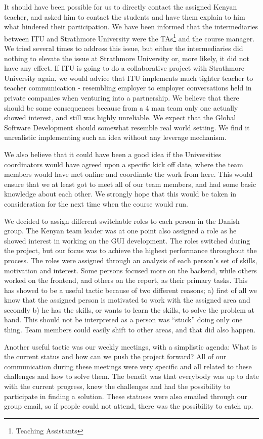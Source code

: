 It should have been possible for us to directly contact the assigned Kenyan teacher, and asked him to contact the students and have them explain to him what hindered their participation. We have been informed that the intermediaries between ITU and Strathmore University were the TAs\footnote{Teaching Assistants} and the course manager. We tried several times to address this issue, but either the intermediaries did nothing to elevate the issue at Strathmore University or, more likely, it did not have any effect. If ITU is going to do a collaborative project with Strathmore University again, we would advice that ITU implements much tighter teacher to teacher communication - resembling employer to employer conversations held in private companies when venturing into a partnership. We believe that there should be some consequences because from a 4 man team only one actually showed interest, and still was highly unreliable. We expect that the Global Software Development should somewhat resemble real world setting. We find it unrealistic implementing such an idea without any leverage mechanism.

We also believe that it could have been a good idea if the Universities coordinators would have agreed upon a specific kick off date, where the team members would have met online and coordinate the work from here. This would ensure that we at least got to meet all of our team members, and had some basic knowledge about each other. We strongly hope that this would be taken in consideration for the next time when the course would run.

We decided to assign different switchable roles to each person in the Danish group. The Kenyan team leader was at one point also assigned a role as he showed interest in working on the GUI development. The roles switched during the project, but our focus was to achieve the highest performance throughout the process. The roles were assigned through an analysis of each person's set of skills, motivation and interest. Some persons focused more on the backend, while others worked on the frontend, and others on the report, as their primary tasks. This has showed to be a useful tactic because of two different reasons; a) first of all we know that the assigned person is motivated to work with the assigned area and secondly b) he has the skills, or wants to learn the skills, to solve the problem at hand. This should not be interpreted as a person was ``stuck'' doing only one thing. Team members could easily shift to other areas, and that did also happen.

Another useful tactic was our weekly meetings, with a simplistic agenda: What is the current status and how can we push the project forward? All of our communication during these meetings were very specific and all related to these challenges and how to solve them. The benefit was that everybody was up to date with the current progress, knew the challenges and had the possibility to participate in finding a solution. These statuses were also emailed through our group email, so if people could not attend, there was the possibility to catch up.
